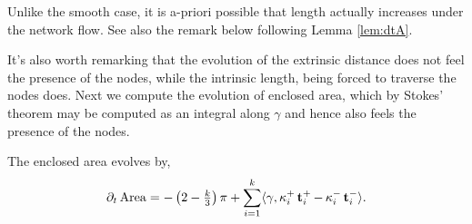 \documentclass[11pt]{amsart}
\begin{document}
\begin{remark}
Unlike the smooth case, it is a-priori possible that length actually increases under the network flow. See also the remark below following Lemma \ref{lem:dtA}.
\end{remark}

It's also worth remarking that the evolution of the extrinsic distance does not feel the presence of the nodes, while the intrinsic length, being forced to traverse the nodes does. Next we compute the evolution of enclosed area, which by Stokes' theorem may be computed as an integral along \(\gamma\) and hence also feels the presence of the nodes.

\begin{lemma}
\label{lem:dtA}
The enclosed area evolves by,
\[
\partial_t \operatorname{Area} = - \left(2 - \tfrac{k}{3}\right)\pi + \sum_{i=1}^k \langle{\gamma},{\operatorname{\kappa}_i^+ \operatorname{\mathbf{t}}_i^+ - \operatorname{\kappa}_i^- \operatorname{\mathbf{t}}_i^-}\rangle.
\]
\end{lemma}
\end{document}
